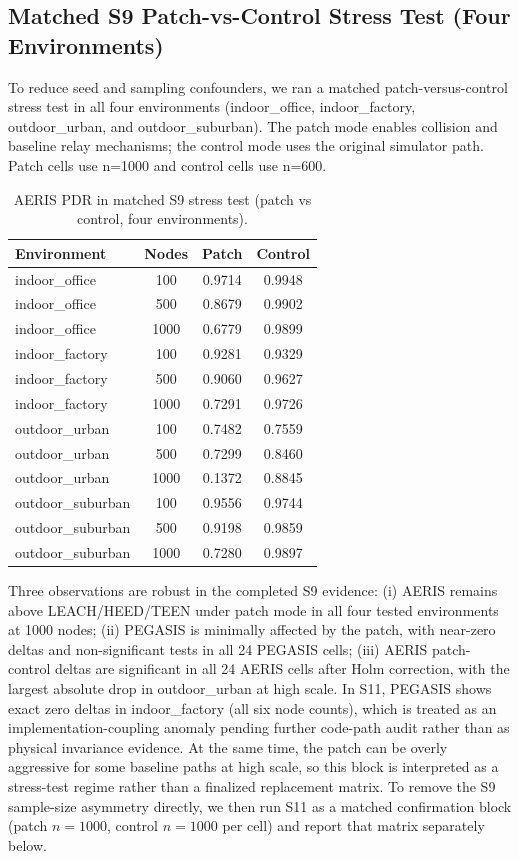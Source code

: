 \documentclass[sensors,article,submit,moreauthors,pdftex]{Definitions/mdpi}
\begin{document}
\subsection{Matched S9 Patch-vs-Control Stress Test (Four Environments)}
To reduce seed and sampling confounders, we ran a matched patch-versus-control stress test in all four environments (indoor\_office, indoor\_factory, outdoor\_urban, and outdoor\_suburban). The patch mode enables collision and baseline relay mechanisms; the control mode uses the original simulator path. Patch cells use n=1000 and control cells use n=600.

\begin{table}[H]
\caption{AERIS PDR in matched S9 stress test (patch vs control, four environments).}
\label{tab:s9_patch_control}
\centering
\begin{tabular}{lccc}
\toprule
Environment & Nodes & Patch & Control \\
\midrule
indoor\_office & 100  & 0.9714 & 0.9948 \\
indoor\_office & 500  & 0.8679 & 0.9902 \\
indoor\_office & 1000 & 0.6779 & 0.9899 \\
indoor\_factory & 100  & 0.9281 & 0.9329 \\
indoor\_factory & 500  & 0.9060 & 0.9627 \\
indoor\_factory & 1000 & 0.7291 & 0.9726 \\
outdoor\_urban & 100  & 0.7482 & 0.7559 \\
outdoor\_urban & 500  & 0.7299 & 0.8460 \\
outdoor\_urban & 1000 & 0.1372 & 0.8845 \\
outdoor\_suburban & 100  & 0.9556 & 0.9744 \\
outdoor\_suburban & 500  & 0.9198 & 0.9859 \\
outdoor\_suburban & 1000 & 0.7280 & 0.9897 \\
\bottomrule
\end{tabular}
\end{table}

Three observations are robust in the completed S9 evidence: (i) AERIS remains above LEACH/HEED/TEEN under patch mode in all four tested environments at 1000 nodes; (ii) PEGASIS is minimally affected by the patch, with near-zero deltas and non-significant tests in all 24 PEGASIS cells; (iii) AERIS patch-control deltas are significant in all 24 AERIS cells after Holm correction, with the largest absolute drop in outdoor\_urban at high scale. In S11, PEGASIS shows exact zero deltas in indoor\_factory (all six node counts), which is treated as an implementation-coupling anomaly pending further code-path audit rather than as physical invariance evidence. At the same time, the patch can be overly aggressive for some baseline paths at high scale, so this block is interpreted as a stress-test regime rather than a finalized replacement matrix. To remove the S9 sample-size asymmetry directly, we then run S11 as a matched confirmation block (patch \(n=1000\), control \(n=1000\) per cell) and report that matrix separately below.
\end{document}
